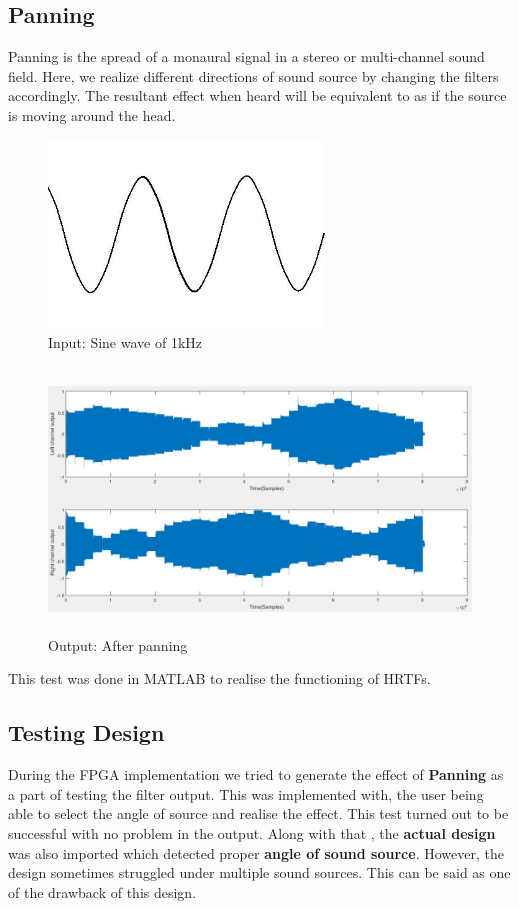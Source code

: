 \documentclass[BTech]{nitkdiss}
\begin{document}
\subsection{Panning}
Panning is the spread of a monaural signal in a stereo or multi-channel sound field. Here, we realize different directions of sound source by changing the filters accordingly. The resultant effect when heard will be equivalent to as if the source is moving around the head. 
\begin{figure}[h!]
\includegraphics[width = \textwidth, height = 5cm]{sine}
\caption{Input: Sine wave of 1kHz}
\end{figure}
\begin{figure}[h!]
\includegraphics[width = \textwidth, height = 7cm]{output_sine}
\caption{Output: After panning}
\end{figure}
This test was done in MATLAB to realise the functioning of HRTFs. 
\subsection{Testing Design}

During the FPGA implementation we tried to generate the effect of \textbf{Panning} as a part of testing the filter output. This was implemented with, the user being able to select the angle of source and realise the effect. This test turned out to be successful with no problem in the output. Along with that , the \textbf{actual design} was also imported which detected proper \textbf{angle of sound source}. However, the design sometimes struggled under multiple sound sources. This can be said as one of the drawback of this design. 
\end{document}
